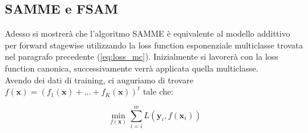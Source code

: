 \subsection{SAMME e FSAM}
Adesso si mostrer\`a che l'algoritmo SAMME \`e equivalente al modello addittivo per forward stagewise utilizzando 
la loss function esponenziale multiclasse trovata nel paragrafo precedente (\ref{eq:loss_mc}). Inizialmente si lavorer\`a con la loss function 
canonica, successivamente verr\`a applicata quella multiclasse.\\
\newline
Avendo dei dati di training, ci auguriamo di trovare \begin{math}f(\textbf{x}) = 
(f_1(\textbf{x})+ ...+ f_K(\textbf{x}))^t \end{math} tale che:
\begin{center}
 \begin{equation}\label{eq:minimo}
 \underset{f(\textbf{x})}{\operatorname{min}} \sum_{i=i}^mL(\textbf{y}_i,f(\textbf{x}_i))
\end{equation}
\end{center}

